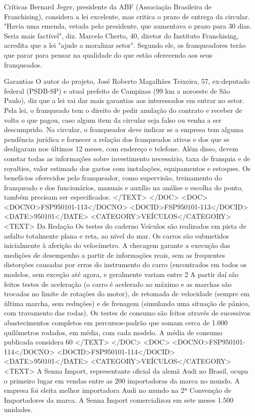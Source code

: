 Críticas
Bernard Jeger, presidente da ABF (Associação Brasileira de Franchising), considera a lei excelente, mas critica o prazo de entrega da circular. "Havia uma emenda, vetada pelo presidente, que aumentava o prazo para 30 dias. Seria mais factível", diz.
Marcelo Cherto, 40, diretor do Instituto Franchising, acredita que a lei "ajude a moralizar setor".
Segundo ele, os franqueadores terão que parar para pensar na qualidade do que estão oferecendo aos seus franqueados.

Garantias 
O autor do projeto, José Roberto Magalhães Teixeira, 57, ex-deputado federal (PSDB-SP) e atual prefeito de Campinas (99 km a noroeste de São Paulo), diz que a lei vai dar mais garantias aos interessados em entrar no setor.
Pela lei, o franqueado tem o direito de pedir anulação do contrato e receber de volta o que pagou, caso algum item da circular seja falso ou venha a ser descumprido.
Na circular, o franqueador deve indicar se a empresa tem alguma pendência jurídica e fornecer a relação dos franqueados ativos e dos que se desligaram nos últimos 12 meses, com endereço e telefone.
Além disso, devem constar todas as informações sobre investimento necessário, taxa de franquia e de royalties, valor estimado dos gastos com instalações, equipamentos e estoques.
Os benefícios oferecidos pelo franqueador, como supervisão, treinamento do franqueado e dos funcionários, manuais e auxílio na análise e escolha do ponto, também precisam ser especificados.
</TEXT>
</DOC>
<DOC>
<DOCNO>FSP950101-113</DOCNO>
<DOCID>FSP950101-113</DOCID>
<DATE>950101</DATE>
<CATEGORY>VEÍCULOS</CATEGORY>
<TEXT>
Da Redação 
Os testes do caderno Veículos são realizados em pista de asfalto totalmente plana e reta, ao nível do mar.
Os carros são submetidos inicialmente à aferição do velocímetro. A checagem garante a execução das medições de desempenho a partir de informações reais, sem as frequentes distorções causadas por erros do instrumento do carro (encontrados em todos os modelos, sem exceção até agora, e geralmente variam entre 2%
A partir daí são feitos testes de aceleração (o carro é acelerado ao máximo e as marchas são trocadas no limite de rotações do motor), de retomada de velocidade (sempre em última marcha, sem reduções) e de frenagem (simulando uma situação de pânico, com travamento das rodas).
Os testes de consumo são feitos através de sucessivos abastecimentos completos em percursos-padrão que somam cerca de 1.000 quilômetros rodados, em média, com cada modelo.
A média de consumo publicada considera 60%
</TEXT>
</DOC>
<DOC>
<DOCNO>FSP950101-114</DOCNO>
<DOCID>FSP950101-114</DOCID>
<DATE>950101</DATE>
<CATEGORY>VEÍCULOS</CATEGORY>
<TEXT>
A Senna Import, representante oficial da alemã Audi no Brasil, ocupa o primeiro lugar em vendas entre as 200 importadoras da marca no mundo. A empresa foi eleita melhor importadora Audi no mundo na 2ª Convenção de Importadores da marca. A Senna Import comercializou em sete meses 1.500 unidades.

